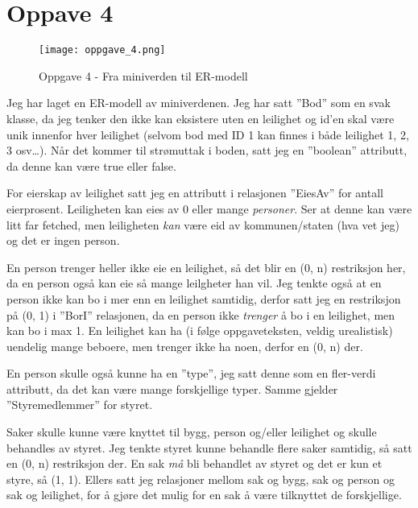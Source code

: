 \documentclass[12pt,a4paper]{article}
\begin{document}
			\newpage
			\section{Oppave 4}
			\begin{figure}[ht!]
				\centering
				\texttt{[image: oppgave\_4.png]}
				\caption{Oppgave 4 - Fra miniverden til ER-modell}
				\label{fig:oppgave_4}
			\end{figure}
			
			Jeg har laget en ER-modell av miniverdenen. Jeg har satt ''Bod'' som en svak klasse, da jeg tenker den ikke kan eksistere uten en leilighet og id'en skal være unik innenfor hver leilighet (selvom bod med ID 1 kan finnes i både leilighet 1, 2, 3 osv\dots). Når det kommer til strømuttak i boden, satt jeg en ''boolean'' attributt, da denne kan være true eller false.
			
			 For eierskap av leilighet satt jeg en attributt i relasjonen ''EiesAv'' for antall eierprosent. Leiligheten kan eies av 0 eller mange \textit{personer}. Ser at denne kan være litt far fetched, men leiligheten \textit{kan} være eid av kommunen/staten (hva vet jeg) og det er ingen person.
			 
			  En person trenger heller ikke eie en leilighet, så det blir en (0, n) restriksjon her, da en person også kan eie så mange leilgheter han vil. Jeg tenkte også at en person ikke kan bo i mer enn en leilighet samtidig, derfor satt jeg en restriksjon på (0, 1) i ''BorI'' relasjonen, da en person ikke \textit{trenger} å bo i en leilighet, men kan bo i max 1. En leilighet kan ha (i følge oppgaveteksten, veldig urealistisk) uendelig mange beboere, men trenger ikke ha noen, derfor en (0, n) der. 
			  
			  En person skulle også kunne ha en ''type'', jeg satt denne som en fler-verdi attributt, da det kan være mange forskjellige typer. Samme gjelder ''Styremedlemmer'' for styret. 
			  
			  Saker skulle kunne være knyttet til bygg, person og/eller leilighet og skulle behandles av styret. Jeg tenkte styret kunne behandle flere saker samtidig, så satt en (0, n) restriksjon der. En sak \textit{må} bli behandlet av styret og det er kun et styre, så (1, 1). Ellers satt jeg relasjoner mellom sak og bygg, sak og person og sak og leilighet, for å gjøre det mulig for en sak å være tilknyttet de forskjellige. 
\end{document}
